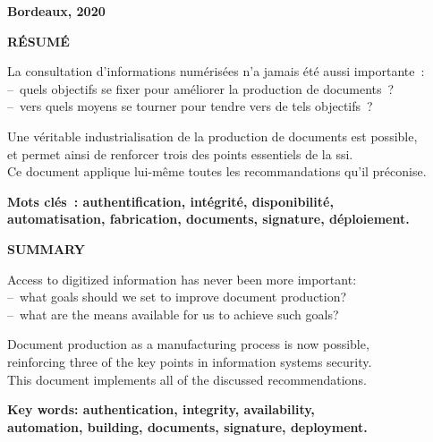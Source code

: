 {}
\cnam

\begin{large}\fulltitle\end{large}

\textbf{\goal}

\textbf{Bordeaux, 2020}

\hr

\textbf{RÉSUMÉ}

La consultation d’informations numérisées n’a jamais été aussi importante :\\
– quels objectifs se fixer pour améliorer la production de documents ?\\
– vers quels moyens se tourner pour tendre vers de tels objectifs ?

Une véritable industrialisation de la production de documents est possible,\\
et permet ainsi de renforcer trois des points essentiels de la \gls{ssi}.\\
Ce document applique lui-même toutes les recommandations qu’il préconise.

\textbf{Mots clés : authentification, intégrité, disponibilité,\\
automatisation, fabrication, documents, signature, déploiement.}

\hr

\textbf{SUMMARY}

Access to digitized information has never been more important:\\
– what goals should we set to improve document production?\\
– what are the means available for us to achieve such goals?

Document production as a manufacturing process is now possible,\\
reinforcing three of the key points in information systems security.\\
This document implements all of the discussed recommendations.

\textbf{Key words: authentication, integrity, availability,\\
automation, building, documents, signature, deployment.}

\thispagestyle{empty}
\pagebreak
